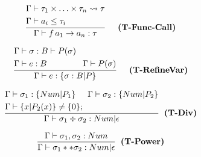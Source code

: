 \begin{minipage}[c]{0.1\textwidth}
\[
    \frac{
        \begin{aligned}
            &\Gamma\vdash \tau_1\times \ldots\times \tau_n \rightsquigarrow \tau \\
            &\Gamma\vdash a_i \leq \tau_i
        \end{aligned}}
    {\Gamma\vdash f \, a_1 \to a_n : \tau} \hspace{0.5cm} \textbf{(T-Func-Call)}
\]
\end{minipage}
\hfill\begin{minipage}[c]{0.44\textwidth}
\[
    \frac{
        \begin{aligned}
            &\Gamma\vdash \sigma:B \vdash P(\sigma) \\
            &\Gamma \vdash e:B \hspace{1.5cm} \Gamma\vdash P(\sigma)
        \end{aligned}}
    {\Gamma\vdash e:\{ \sigma: B|P \}} \hspace{0.5cm} \textbf{(T-RefineVar)}
\]
\end{minipage}
\hfill



\begin{minipage}[c]{0.49\textwidth}
    \[
    \frac{
      \begin{aligned}
        &\Gamma\vdash\sigma_1 : \{Num|P_1\} \hspace{0.5cm} \Gamma\vdash\sigma_2:\{Num|P_2\} \\
        &\Gamma\vdash \{ x | P_2(x) \} \neq \{ 0 \};
      \end{aligned}
    }
    {\Gamma\vdash \sigma_1 \div \sigma_2: Num|\epsilon} \hspace{0.2cm} \textbf{(T-Div)}
    \]
\end{minipage}
\hfill
\begin{minipage}[c]{0.32\textwidth}
    \[
    \frac{\Gamma\vdash\sigma_1, \sigma_2 :Num}
    {\Gamma\vdash \sigma_1 ** \sigma_2: Num|\epsilon} \hspace{0.2cm} \textbf{(T-Power)}
    \]
\end{minipage}
\hfill



